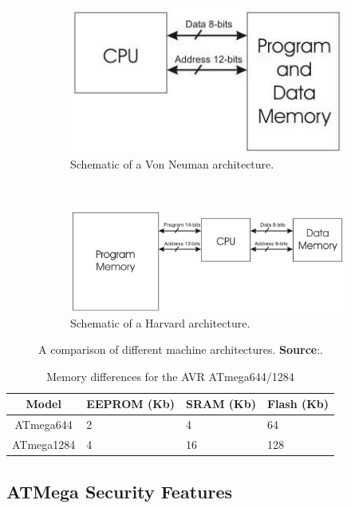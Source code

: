 \begin{figure}
	\begin{subfigure}{0.5\textwidth}
		\center
		\includegraphics[scale=0.5]{img/von_neuman_arch.jpg}
		\caption{Schematic of a Von Neuman architecture.}
		\label{fig:VN_arch}
	\end{subfigure} 
	~
	\begin{subfigure}{0.5\textwidth}
		\center
		\includegraphics[scale=0.5]{img/harvard_arch.jpeg}
		\caption{Schematic of a Harvard architecture.}
		\label{fig:H_arch}
	\end{subfigure}
	\caption{A comparison of different machine architectures. \textbf{Source}:\protect\citep{website:mcu_primer}.}
	\label{fig:architectures}
\end{figure}	
		
\begin{table}
	\caption{{\footnotesize Memory differences for the AVR ATmega644/1284}}
	\label{table:avr_specs}
	\begin{tabular}{| c | p{2cm} | p{1.8cm} | p{1.5cm} |}
		\hline
		\textbf{Model} & \textbf{EEPROM (Kb)} & \textbf{SRAM (Kb)} & \textbf{Flash (Kb)}\\
		\hline	\hline
		ATmega644 & 2 & 4 & 64\\
		ATmega1284 & 4 & 16 & 128\\
		\hline
	\end{tabular}
	
\end{table}
	
	\subsection{ATMega Security Features}
	
